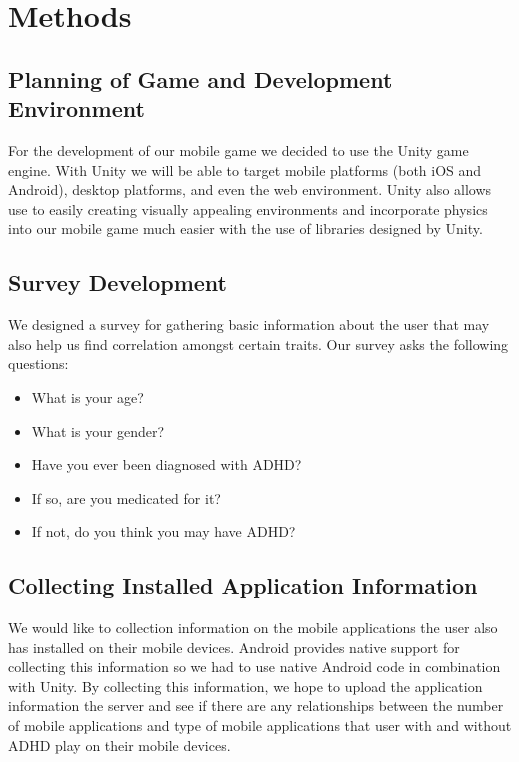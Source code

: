 \documentclass[a4wide]{article}
\begin{document}
\section{Methods}
\subsection{Planning of Game and Development Environment}
\- For the development of our mobile game we decided to use the Unity game engine. With Unity we will be able to target mobile platforms (both iOS and Android), desktop platforms, and even the web environment. Unity also allows use to easily creating visually appealing environments and incorporate physics into our mobile game much easier with the use of libraries designed by Unity.

\subsection{Survey Development}
\- We designed a survey for gathering basic information about the user that may also help us find correlation amongst certain traits.
Our survey asks the following questions:

\begin{itemize}
  \item What is your age?
  \item What is your gender?
  \item Have you ever been diagnosed with ADHD?
  \item If so, are you medicated for it?
  \item If not, do you think you may have ADHD?
\end{itemize}

\subsection{Collecting Installed Application Information}
\- We would like to collection information on the mobile applications the user also has installed on their mobile devices. Android provides native support for collecting this information so we had to use native Android code in combination with Unity. By collecting this information, we hope to upload the application information the server and see if there are any relationships between the number of mobile applications and type of mobile applications that user with and without ADHD play on their mobile devices.
\end{document}
